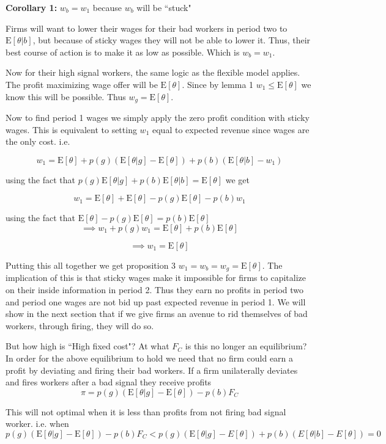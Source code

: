 \documentclass[11pt]{article}
\newcommand{\E}{\mathrm{E}}
\begin{document}
 \textbf{Corollary 1:} $w_b = w_1$ because $w_b$ will be ``stuck"

Firms will want to lower their wages for their bad workers in period two to $\E[\theta |b]$, but because of sticky wages they will not be able to lower it. Thus, their best course of action is to make it as low as possible. Which is $w_b = w_1$. \par 

Now for their high signal workers, the same logic as the flexible model applies. The profit maximizing wage offer will be $\E[\theta]$. Since by lemma 1  $w_1 \leq \E[\theta]$ we know this will be possible. Thus $w_g = \E[\theta]$. \par 

Now to find period 1 wages we simply apply the zero profit condition with sticky wages. This is equivalent to setting $w_1$ equal to expected revenue since wages are the only cost. i.e. 

$$ w_1 = \E[\theta] + p(g)(\E[\theta|g] - \E[\theta]) + p(b)(\E[\theta|b] - w_1) $$

using the fact that $p(g)\E[\theta|g] + p(b)\E[\theta|b] = \E[\theta]$ we get 

$$ w_1 = \E[\theta] + \E[\theta] - p(g)\E[\theta] - p(b)w_1$$

using the fact that $ \E[\theta] - p(g)\E[\theta] = p(b)\E[\theta]$
$$ \implies w_1 +p(g)w_1 = \E[\theta] + p(b)\E[\theta]
$$

$$ \implies w_1 = \E[\theta]$$

Putting this all together we get proposition 3 $w_1 = w_b = w_g =\E[\theta]$. The implication of this is that sticky wages make it impossible for firms to capitalize on their inside information in period 2. Thus they earn no profits in period two and period one wages are not bid up past expected revenue in period 1. We will show in the next section that if we give firms an avenue to rid themselves of bad workers, through firing, they will do so. \par 

But how high is ``High fixed cost"? At what $F_C$ is this no longer an equilibrium? In order for the above equilibrium to hold we need that no firm could earn a profit by deviating and firing their bad workers. If a firm unilaterally deviates and fires workers after a bad signal they receive profits 
$$ \pi = p(g) (\E[\theta|g] - \E[\theta]) - p(b)F_C $$

This will not optimal when it is less than profits from not firing bad signal worker. i.e. when 
$$  p(g) (\E[\theta|g] - \E[\theta]) - p(b)F_C < p(g)( \E[\theta|g] - E[\theta]) + p(b)(E[\theta|b] - E[\theta]) = 0 $$  
\end{document}
